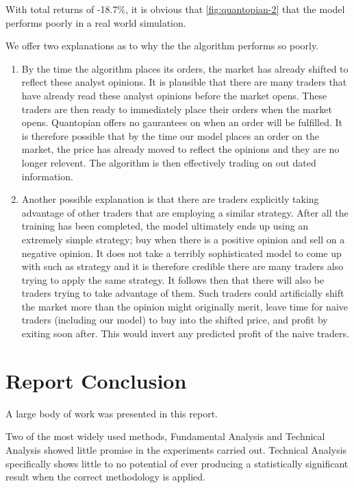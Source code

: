 \documentclass{report}
\begin{document}
With total returns of -18.7\%, it is obvious that \ref{fig:quantopian-2} that the model performs poorly in a real world simulation. 

We offer two explanations as to why the the algorithm performs so poorly. 
\begin{enumerate}
  \item By the time the algorithm places its orders, the market has already shifted to reflect these analyst opinions. It is plausible that there are many traders that have already read these analyst opinions before the market opens. These traders are then ready to immediately place their orders when the market opens. Quantopian offers no gaurantees on when an order will be fulfilled. It is therefore possible that by the time our model places an order on the market, the price has already moved to reflect the opinions and they are no longer relevent. The algorithm is then effectively trading on out dated information.
  
  \item Another possible explanation is that there are traders explicitly taking advantage of other traders that are employing a similar strategy. After all the training has been completed, the model ultimately ends up using an extremely simple strategy; buy when there is a positive opinion and sell on a negative opinion. It does not take a terribly sophisticated model to come up with such as strategy and it is therefore credible there are many traders also trying to apply the same strategy. It follows then that there will also be traders trying to take advantage of them. Such traders could artificially shift the market more than the opinion might originally merit, leave time for naive traders (including our model) to buy into the shifted price, and profit by exiting soon after. This would invert any predicted profit of the naive traders.
\end{enumerate}

\chapter{Report Conclusion}

A large body of work was presented in this report. 

Two of the most widely used methods, Fundamental Analysis and Technical Analysis showed little promise in the experiments carried out. Technical Analysis specifically shows little to no potential of ever producing a statistically significant result when the correct methodology is applied.
\end{document}
